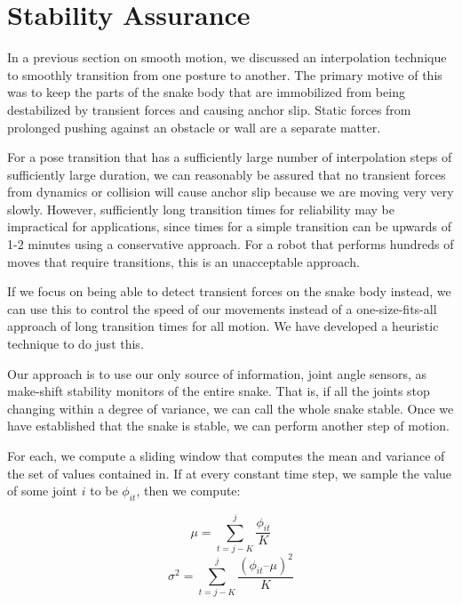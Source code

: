 \section{Stability Assurance}

\label{sec:stability}

In a previous section on smooth motion, we discussed an interpolation technique to smoothly transition from one posture to another.  The primary motive of this was to keep the parts of the snake body that are immobilized from being destabilized by transient forces and causing anchor slip.  Static forces from prolonged pushing against an obstacle or wall are a separate matter.

For a pose transition that has a sufficiently large number of interpolation steps of sufficiently large duration, we can reasonably be assured that no transient forces from dynamics or collision will cause anchor slip because we are moving very very slowly.  However, sufficiently long transition times for reliability may be impractical for applications, since times for a simple transition can be upwards of 1-2 minutes using a conservative approach.  For a robot that performs hundreds of moves that require transitions, this is an unacceptable approach.

If we focus on being able to detect transient forces on the snake body instead, we can use this to control the speed of our movements instead of a one-size-fits-all approach of long transition times for all motion.  We have developed a heuristic technique to do just this.

Our approach is to use our only source of information, joint angle sensors, as make-shift stability monitors of the entire snake.  That is, if all the joints stop changing within a degree of variance, we can call the whole snake stable.  Once we have established that the snake is stable, we can perform another step of motion. 

For each, we compute a sliding window that computes the mean and variance of the set of values contained in.  If at every constant time step, we sample the value of some joint $i$ to be $\phi_{it}$, then we compute:

\begin{equation}
\mu = \sum_{t = j-K}^{j} \frac{\phi_{it}}{K}
\end{equation}
\begin{equation}
\sigma^2 = \sum_{t=j-K}^{j} \frac{(\phi_{it} – \mu)^2}{K}
\end{equation}

